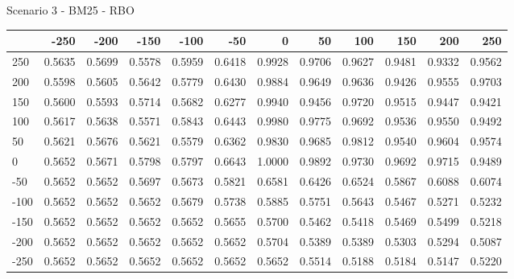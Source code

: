 Scenario 3 - BM25 - RBO
\begin{tabular}{lrrrrrrrrrrr}
\toprule
{} &   -250 &   -200 &   -150 &   -100 &   -50  &    0   &    50  &    100 &    150 &    200 &    250 \\
\midrule
 250 & 0.5635 & 0.5699 & 0.5578 & 0.5959 & 0.6418 & 0.9928 & 0.9706 & 0.9627 & 0.9481 & 0.9332 & 0.9562 \\
 200 & 0.5598 & 0.5605 & 0.5642 & 0.5779 & 0.6430 & 0.9884 & 0.9649 & 0.9636 & 0.9426 & 0.9555 & 0.9703 \\
 150 & 0.5600 & 0.5593 & 0.5714 & 0.5682 & 0.6277 & 0.9940 & 0.9456 & 0.9720 & 0.9515 & 0.9447 & 0.9421 \\
 100 & 0.5617 & 0.5638 & 0.5571 & 0.5843 & 0.6443 & 0.9980 & 0.9775 & 0.9692 & 0.9536 & 0.9550 & 0.9492 \\
 50  & 0.5621 & 0.5676 & 0.5621 & 0.5579 & 0.6362 & 0.9830 & 0.9685 & 0.9812 & 0.9540 & 0.9604 & 0.9574 \\
 0   & 0.5652 & 0.5671 & 0.5798 & 0.5797 & 0.6643 & 1.0000 & 0.9892 & 0.9730 & 0.9692 & 0.9715 & 0.9489 \\
-50  & 0.5652 & 0.5652 & 0.5697 & 0.5673 & 0.5821 & 0.6581 & 0.6426 & 0.6524 & 0.5867 & 0.6088 & 0.6074 \\
-100 & 0.5652 & 0.5652 & 0.5652 & 0.5679 & 0.5738 & 0.5885 & 0.5751 & 0.5643 & 0.5467 & 0.5271 & 0.5232 \\
-150 & 0.5652 & 0.5652 & 0.5652 & 0.5652 & 0.5655 & 0.5700 & 0.5462 & 0.5418 & 0.5469 & 0.5499 & 0.5218 \\
-200 & 0.5652 & 0.5652 & 0.5652 & 0.5652 & 0.5652 & 0.5704 & 0.5389 & 0.5389 & 0.5303 & 0.5294 & 0.5087 \\
-250 & 0.5652 & 0.5652 & 0.5652 & 0.5652 & 0.5652 & 0.5652 & 0.5514 & 0.5188 & 0.5184 & 0.5147 & 0.5220 \\
\bottomrule
\end{tabular}

